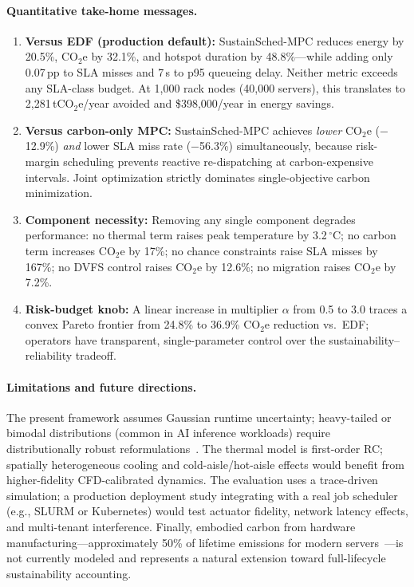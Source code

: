 \documentclass[a4paper,fleqn]{cas-dc}
\begin{document}
\paragraph{Quantitative take-home messages.}
\begin{enumerate}
  \item \textbf{Versus EDF (production default):} SustainSched-MPC reduces energy by 20.5\%, CO$_2$e by 32.1\%, and hotspot duration by 48.8\%---while adding only 0.07\,pp to SLA misses and 7\,s to p95 queueing delay. Neither metric exceeds any SLA-class budget. At 1,000 rack nodes (40,000 servers), this translates to 2,281\,tCO$_2$e/year avoided and \$398,000/year in energy savings.
  \item \textbf{Versus carbon-only MPC:} SustainSched-MPC achieves \emph{lower} CO$_2$e ($-$12.9\%) \emph{and} lower SLA miss rate ($-$56.3\%) simultaneously, because risk-margin scheduling prevents reactive re-dispatching at carbon-expensive intervals. Joint optimization strictly dominates single-objective carbon minimization.
  \item \textbf{Component necessity:} Removing any single component degrades performance: no thermal term raises peak temperature by 3.2$\,^\circ$C; no carbon term increases CO$_2$e by 17\%; no chance constraints raise SLA misses by 167\%; no DVFS control raises CO$_2$e by 12.6\%; no migration raises CO$_2$e by 7.2\%.
  \item \textbf{Risk-budget knob:} A linear increase in multiplier $\alpha$ from 0.5 to 3.0 traces a convex Pareto frontier from 24.8\% to 36.9\% CO$_2$e reduction vs.\ EDF; operators have transparent, single-parameter control over the sustainability--reliability tradeoff.
\end{enumerate}

\paragraph{Limitations and future directions.}
The present framework assumes Gaussian runtime uncertainty; heavy-tailed or bimodal distributions (common in AI inference workloads) require distributionally robust reformulations~\cite{ref-nemirovski06}. The thermal model is first-order RC; spatially heterogeneous cooling and cold-aisle/hot-aisle effects would benefit from higher-fidelity CFD-calibrated dynamics. The evaluation uses a trace-driven simulation; a production deployment study integrating with a real job scheduler (e.g., SLURM or Kubernetes) would test actuator fidelity, network latency effects, and multi-tenant interference. Finally, embodied carbon from hardware manufacturing---approximately 50\% of lifetime emissions for modern servers~\cite{ref-peltonen25}---is not currently modeled and represents a natural extension toward full-lifecycle sustainability accounting.
\end{document}

